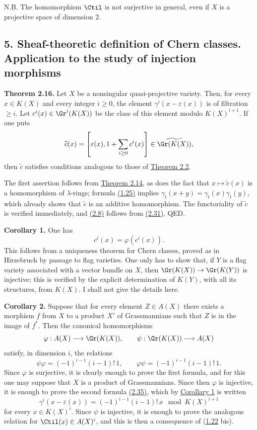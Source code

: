 N.B. The homomorphism $\Ctil$ is not surjective in general, even if $X$ is a projective space of dimension $2$.

\subsection*{5. Sheaf-theoretic definition of Chern classes. Application to the study of injection morphisms}

\textbf{Theorem 2.16.} Let $X$ be a nonsingular quasi-projective variety. Then, for every $x\in K(X)$ and every integer $i\geq 0$, the element $\gamma^i(x-\varepsilon(x))$ is of filtration $\geq i$. Let $c^i(x)\in\Gr^i(K(X))$ be the class of this element modulo $K(X)^{i+1}$. If one puts
\[
 \widetilde c(x)=\left[\varepsilon(x),1+\sum_{i\geq 0}c^i(x)\right]\in \widetilde{\Gr(K(X))},
\]
then $\widetilde c$ satisfies conditions analogous to those of \hyperlink{sga6.e00.thm.2-2}{Theorem 2.2}.

The first assertion follows from \hyperlink{sga6.e00.thm.2-14}{Theorem 2.14}, as does the fact that $x\mapsto\widetilde c(x)$ is a homomorphism of $\lambda$-rings; formula \hyperlink{sga6.e00.eq.1-25}{(1.25)} implies $\gamma_t(x+y)=\gamma_t(x)\gamma_t(y)$, which already shows that $\widetilde c$ is an additive homomorphism. The functoriality of $\widetilde c$ is verified immediately, and \hyperlink{sga6.e00.prop.2-8}{(2.8)} follows from \hyperlink{sga6.e00.eq.2-31}{(2.31)}. QED.

\textbf{Corollary 1.} One has
\[
 c^i(x)=\varphi(c^i(x)).
\]
This follows from a uniqueness theorem for Chern classes, proved as in Hirzebruch by passage to flag varieties. One only has to show that, if $Y$ is a flag variety associated with a vector bundle on $X$, then $\Gr(K(X))\to\Gr(K(Y))$ is injective; this is verified by the explicit determination of $K(Y)$, with all its structures, from $K(X)$. I shall not give the details here.

\textbf{Corollary 2.} Suppose that for every element $Z\in A(X)$ there exists a morphism $f$ from $X$ to a product $X'$ of Grassmannians such that $Z$ is in the image of $f^*$. Then the canonical homomorphisms
\[
 \varphi:A(X)\longrightarrow \Gr(K(X)),\qquad
 \psi:\Gr(K(X))\longrightarrow A(X)
\]
satisfy, in dimension $i$, the relations
\begin{equation}\tag{2.35}
 \psi\varphi=(-1)^{i-1}(i-1)!\,1,
 \qquad
 \varphi\psi=(-1)^{i-1}(i-1)!\,1.
\end{equation}
Since $\varphi$ is surjective, it is clearly enough to prove the first formula, and for this one may suppose that $X$ is a product of Grassmannians. Since then $\varphi$ is injective, it is enough to prove the second formula \hyperlink{sga6.e00.eq.2-35}{(2.35)}, which by \hyperlink{sga6.e00.cor.1}{Corollary 1} is written
\[
 \gamma^i(x-\varepsilon(x))=(-1)^{i-1}(i-1)!\,x\mod K(X)^{i+1}
\]
for every $x\in K(X)^i$. Since $\psi$ is injective, it is enough to prove the analogous relation for $\Ctil(x)\in A(X)^i$, and this is then a consequence of (\hyperlink{sga6.e00.eq.1-22}{1.22} bis).

